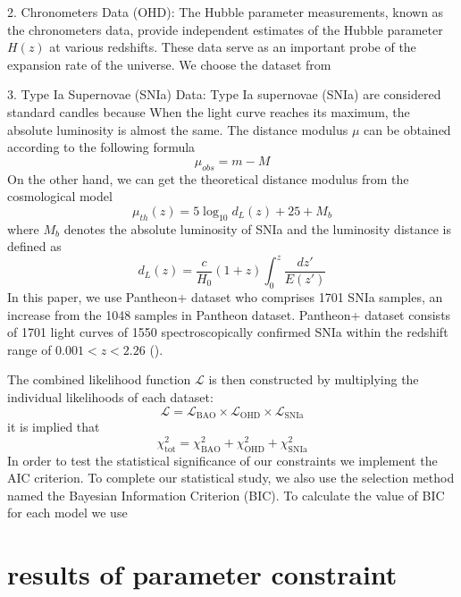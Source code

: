\documentclass[preprint]{aastex631}
\begin{document}
2. Chronometers Data (OHD): The Hubble parameter measurements, known as the chronometers data, provide independent estimates of the Hubble parameter \(H(z)\) at various redshifts. These data serve as an important probe of the expansion rate of the universe. We choose the dataset from \cite{Favale_2023}

3. Type Ia Supernovae (SNIa) Data: Type Ia supernovae (SNIa) are considered standard candles because When the light curve reaches its maximum, the absolute luminosity is almost the same. The distance modulus $\mu$ can be obtained according to the following formula
\begin{equation}
    \mu_{obs}=m-M
\end{equation}
On the other hand, we can get the theoretical distance modulus from the cosmological model
\begin{equation}
    \mu_{th}(z)=5\log_{10}d_L(z)+25+M_b
\end{equation}
where $M_b$ denotes the absolute luminosity of SNIa and the luminosity distance is defined as
\begin{equation}
    d_L(z)=\frac{c}{H_0}(1+z)\int_0^z \frac{dz'}{E(z')}
\end{equation}
In this paper, we use Pantheon+ dataset who comprises 1701 SNIa samples, an increase from the 1048 samples in Pantheon dataset. Pantheon+ dataset consists of 1701 light curves of 1550 spectroscopically confirmed SNIa within the redshift range of $0.001 < z < 2.26$ (\cite{Scolnic_2022,Brout_2022}).

The combined likelihood function \(\mathcal{L}\) is then constructed by multiplying the individual likelihoods of each dataset:
\begin{equation}
\mathcal{L} = \mathcal{L}_{\text{BAO}} \times \mathcal{L}_{\text{OHD}} \times \mathcal{L}_{\text{SNIa}}
\end{equation}
it is implied that
\begin{equation}
    \chi^2_\text{tot}=\chi^2_{\text{BAO}}+\chi^2_{\text{OHD}} +\chi^2_{\text{SNIa}}
\end{equation}
In order to test the statistical significance of our constraints we implement the AIC criterion.
To complete our statistical study, we also use the selection method named the Bayesian Information Criterion (BIC). To calculate the value of BIC for each model we use




\section{results of parameter constraint}
\end{document}

